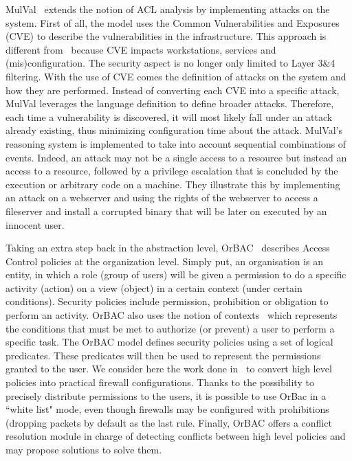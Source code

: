 MulVal~\cite{mulval-Ou2013} extends the notion of ACL analysis by implementing attacks on the system. 
First of all, the model uses the Common Vulnerabilities and Exposures (CVE) to describe the vulnerabilities in the infrastructure. This approach is different from~\cite{Matousek2008} because CVE impacts workstations, services and (mis)configuration. The security aspect is no longer only limited to  Layer 3\&4 filtering.
With the use of CVE comes the definition of attacks on the system and how they are performed.
Instead of converting each CVE into a specific attack, MulVal leverages the language definition to define broader attacks.
Therefore, each time a vulnerability is discovered, it will most likely fall under an attack already existing, thus minimizing configuration time about the attack.
MulVal's reasoning system is implemented to take into account sequential combinations of events.
Indeed, an attack may not be a single access to a resource but instead an access to a resource, followed by a privilege escalation that is concluded by the execution or arbitrary code on a machine.
They illustrate this by implementing an attack on a webserver and using the rights of the webserver to access a fileserver and install a corrupted binary that will be later on executed by an innocent user.

Taking an extra step back in the abstraction level, OrBAC~\cite{orbac} describes Access Control policies at the organization level. Simply put, an organisation is an entity, in which a role (\ie group of users) will be given a permission to do a specific activity (\ie action) on a view (\ie object) in a certain context (\ie under certain conditions).
Security policies include permission, prohibition or obligation to perform an activity.
OrBAC also uses the notion of contexts~\cite{context-orbac} which represents the conditions that must be met to authorize (or prevent) a user to perform a specific task.
The OrBAC model defines security policies using a set of logical predicates. These predicates will then be used to represent the permissions granted to the user.
We consider here the work done in~\cite{Cuppens} to convert high level policies into practical firewall configurations. Thanks to the possibility to precisely distribute permissions to the users, it is possible to use OrBac in a ``white list" mode, even though firewalls may be configured with prohibitions (\ie dropping packets by default as the last rule.
Finally, OrBAC offers a conflict resolution module in charge of detecting conflicts between high level policies and may propose solutions to solve them.

